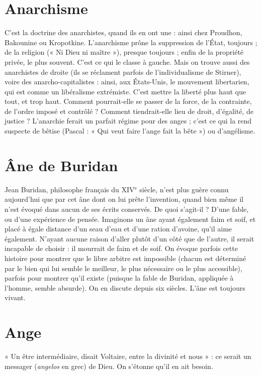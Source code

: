\section{Anarchisme}
C'est la doctrine des anarchistes, quand ils en ont une : ainsi
chez Proudhon, Bakounine ou Kropotkine. L’anarchisme
prône la suppression de l’État, toujours ; de la religion (« Ni Dieu ni maître »),
presque toujours ; enfin de la propriété privée, le plus souvent. C’est ce qui le
classe à gauche. Mais on trouve aussi des anarchistes de droite (ils se réclament
parfois de l’individualisme de Stirner), voire des anarcho-capitalistes : ainsi, aux
États-Unis, le mouvement libertarien, qui est comme un libéralisme extrémiste.
C’est mettre la liberté plus haut que tout, et trop haut. Comment pourrait-elle
se passer de la force, de la contrainte, de l’ordre imposé et contrôlé ? Comment
tiendrait-elle lieu de droit, d'égalité, de justice ? L’anarchie ferait un parfait
régime pour des anges ; c’est ce qui la rend suspecte de bêtise (Pascal : « Qui
veut faire l’ange fait la bête ») ou d’angélisme.

\section{Âne de Buridan}
Jean Buridan, philosophe français du {\footnotesize XIV$^\text{e}$} siècle, n’est
plus guère connu aujourd’hui que par cet âne dont on
lui prête l'invention, quand bien même il n’est évoqué dans aucun de ses écrits
conservés. De quoi s’agit-il ? D’une fable, ou d’une expérience de pensée. Imaginons
un âne ayant également faim et soif, et placé à égale distance d’un seau
d’eau et d’une ration d’avoine, qu’il aime également. N'ayant aucune raison
d’aller plutôt d’un côté que de l’autre, il serait incapable de choisir : il mourrait
de faim et de soif. On évoque parfois cette histoire pour montrer que le libre
arbitre est impossible (chacun est déterminé par le bien qui lui semble le
meilleur, le plus nécessaire ou le plus accessible), parfois pour montrer qu'il
existe (puisque la fable de Buridan, appliquée à l’homme, semble absurde). On
en discute depuis six siècles. L’âne est toujours vivant.

\section{Ange}
« Un être intermédiaire, disait Voltaire, entre la divinité et nous » : ce
serait un messager ({\it angelos} en grec) de Dieu. On s'étonne qu'il en ait
besoin.

